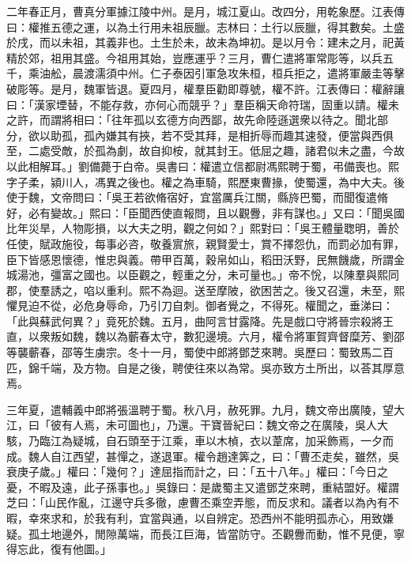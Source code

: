 \begin{pinyinscope}
二年春正月，曹真分軍據江陵中州。是月，城江夏山。改四分，用乾象歷。江表傳曰：權推五德之運，以為土行用未祖辰臘。志林曰：土行以辰臘，得其數矣。土盛於戌，而以未祖，其義非也。土生於未，故未為坤初。是以月令：建未之月，祀黃精於郊，祖用其盛。今祖用其始，豈應運乎？三月，曹仁遣將軍常彫等，以兵五千，乘油舩，晨渡濡須中州。仁子泰因引軍急攻朱桓，桓兵拒之，遣將軍嚴圭等擊破彫等。是月，魏軍皆退。夏四月，權羣臣勸即尊號，權不許。江表傳曰：權辭讓曰：「漢家堙替，不能存救，亦何心而競乎？」羣臣稱天命符瑞，固重以請。權未之許，而謂將相曰：「往年孤以玄德方向西鄙，故先命陸遜選衆以待之。聞北部分，欲以助孤，孤內嫌其有挾，若不受其拜，是相折辱而趣其速發，便當與西俱至，二處受敵，於孤為劇，故自抑桉，就其封王。低屈之趣，諸君似未之盡，今故以此相解耳。」劉備薨于白帝。吳書曰：權遣立信都尉馮熙聘于蜀，弔備喪也。熙字子柔，潁川人，馮異之後也。權之為車騎，熙歷東曹掾，使蜀還，為中大夫。後使于魏，文帝問曰：「吳王若欲脩宿好，宜當厲兵江關，縣旍巴蜀，而聞復遣脩好，必有變故。」熙曰：「臣聞西使直報問，且以觀釁，非有謀也。」又曰：「聞吳國比年災旱，人物彫損，以大夫之明，觀之何如？」熙對曰：「吳王體量聦明，善於任使，賦政施役，每事必咨，敬養賔旅，親賢愛士，賞不擇怨仇，而罰必加有罪，臣下皆感恩懷德，惟忠與義。帶甲百萬，穀帛如山，稻田沃野，民無饑歲，所謂金城湯池，彊富之國也。以臣觀之，輕重之分，未可量也。」帝不恱，以陳羣與熙同郡，使羣誘之，啗以重利。熙不為迴。送至摩陂，欲困苦之。後又召還，未至，熙懼見迫不從，必危身辱命，乃引刀自刺。御者覺之，不得死。權聞之，垂涕曰：「此與蘇武何異？」竟死於魏。五月，曲阿言甘露降。先是戲口守將晉宗殺將王直，以衆叛如魏，魏以為蘄春太守，數犯邊境。六月，權令將軍賀齊督糜芳、劉邵等襲蘄春，邵等生虜宗。冬十一月，蜀使中郎將鄧芝來聘。吳歷曰：蜀致馬二百匹，錦千端，及方物。自是之後，聘使往來以為常。吳亦致方土所出，以荅其厚意焉。

三年夏，遣輔義中郎將張溫聘于蜀。秋八月，赦死罪。九月，魏文帝出廣陵，望大江，曰「彼有人焉，未可圖也」，乃還。干寶晉紀曰：魏文帝之在廣陵，吳人大駭，乃臨江為疑城，自石頭至于江乘，車以木楨，衣以葦席，加采飾焉，一夕而成。魏人自江西望，甚憚之，遂退軍。權令趙達筭之，曰：「曹丕走矣，雖然，吳衰庚子歲。」權曰：「幾何？」達屈指而計之，曰：「五十八年。」權曰：「今日之憂，不暇及遠，此子孫事也。」吳錄曰：是歲蜀主又遣鄧芝來聘，重結盟好。權謂芝曰：「山民作亂，江邊守兵多徹，慮曹丕乘空弄態，而反求和。議者以為內有不暇，幸來求和，於我有利，宜當與通，以自辨定。恐西州不能明孤赤心，用致嫌疑。孤土地邊外，閒隙萬端，而長江巨海，皆當防守。丕觀釁而動，惟不見便，寧得忘此，復有他圖。」


\end{pinyinscope}
